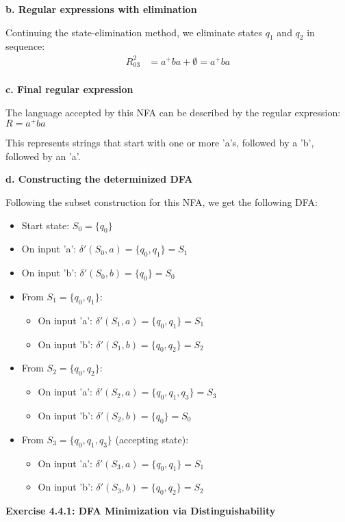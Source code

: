 \documentclass{article}
\theoremstyle{theorem}
\theoremstyle{definition}
\theoremstyle{remark}
\begin{document}
\textbf{b. Regular expressions with elimination}

Continuing the state-elimination method, we eliminate states $q_1$ and $q_2$ in sequence:
\begin{align*}
R^2_{03} &= a^+ba + \emptyset = a^+ba \\
\end{align*}

\textbf{c. Final regular expression}

The language accepted by this NFA can be described by the regular expression:
$R = a^+ba$

This represents strings that start with one or more 'a's, followed by a 'b', followed by an 'a'.

\textbf{d. Constructing the determinized DFA}

Following the subset construction for this NFA, we get the following DFA:
\begin{itemize}
    \item Start state: $S_0 = \{q_0\}$
    \item On input 'a': $\delta'(S_0,a) = \{q_0,q_1\} = S_1$
    \item On input 'b': $\delta'(S_0,b) = \{q_0\} = S_0$
    \item From $S_1 = \{q_0,q_1\}$:
      \begin{itemize}
        \item On input 'a': $\delta'(S_1,a) = \{q_0,q_1\} = S_1$
        \item On input 'b': $\delta'(S_1,b) = \{q_0,q_2\} = S_2$
      \end{itemize}
    \item From $S_2 = \{q_0,q_2\}$:
      \begin{itemize}
        \item On input 'a': $\delta'(S_2,a) = \{q_0,q_1,q_3\} = S_3$
        \item On input 'b': $\delta'(S_2,b) = \{q_0\} = S_0$
      \end{itemize}
    \item From $S_3 = \{q_0,q_1,q_3\}$ (accepting state):
      \begin{itemize}
        \item On input 'a': $\delta'(S_3,a) = \{q_0,q_1\} = S_1$
        \item On input 'b': $\delta'(S_3,b) = \{q_0,q_2\} = S_2$
      \end{itemize}
\end{itemize}

\textbf{Exercise 4.4.1: DFA Minimization via Distinguishability}
\end{document}

